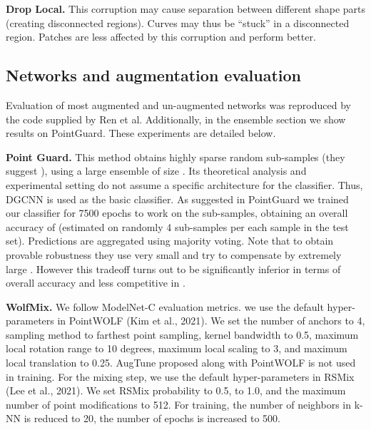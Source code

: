 \documentclass[10pt,twocolumn]{article}
\begin{document}
{\bf Drop Local.} This corruption may cause separation between different shape parts (creating disconnected regions). Curves may thus be ``stuck'' in a disconnected region. Patches are less affected by this corruption and perform better. 






























\subsection{Networks and augmentation evaluation}
Evaluation of most augmented and un-augmented networks was reproduced by the code supplied by Ren et al. Additionally, in the ensemble section we show results on PointGuard. These experiments are detailed below. 



\textbf{Point Guard.} This method obtains highly sparse random sub-samples (they suggest ), using a large ensemble of size . Its theoretical analysis and experimental setting do not assume a specific architecture for the classifier. Thus,  DGCNN is used as the basic classifier. As suggested in PointGuard we trained our classifier for 7500 epochs to work on the sub-samples, obtaining an overall accuracy of  (estimated on randomly 4 sub-samples per each sample in the test set). Predictions are aggregated using majority voting. 
Note that to obtain provable robustness they use very small  and try to compensate by extremely large . However this tradeoff turns out to be significantly inferior in terms of overall accuracy and less competitive in .

\textbf{WolfMix.} We follow ModelNet-C evaluation metrics.
we use the default hyper-parameters in PointWOLF (Kim et al., 2021). We set the number of
anchors to 4, sampling method to farthest point sampling, kernel bandwidth to 0.5, maximum local rotation range to 10 degrees, maximum local scaling to 3, and maximum local translation to 0.25. AugTune proposed along with PointWOLF is not used in training. For the mixing step, we use the default hyper-parameters in RSMix (Lee et al., 2021). We set RSMix probability to 0.5,  to 1.0, and the maximum number of point modifications to 512. For training, the number of neighbors in k-NN is reduced to 20, the number of epochs is increased to 500.
\end{document}
